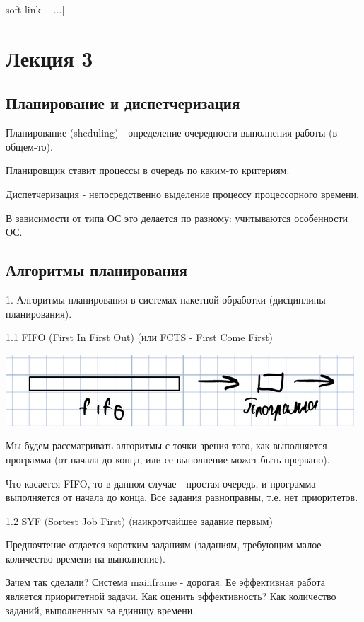 \documentclass[14pt, a4paper]{article}
\begin{document}
	soft link - [...]
	
	\pagebreak
	
	\section{Лекция 3}
	\subsection{Планирование и диспетчеризация}
	
	Планирование (sheduling) - определение очередности выполнения работы (в общем-то).
	
	Планировщик ставит процессы в очередь по каким-то критериям.
	
	Диспетчеризация - непосредственно выделение процессу процессорного времени.
	
	В зависимости от типа ОС это делается по разному: учитываются особенности ОС.
	
	\subsection{Алгоритмы планирования}
	
	1. Алгоритмы планирования в системах пакетной обработки (дисциплины планирования).
	
	1.1 FIFO (First In First Out) (или FCTS - First Come First)
	
	\includegraphics[width=\linewidth]{1}
	
	Мы будем рассматривать алгоритмы с точки зрения того, как выполняется программа (от начала до конца, или ее выполнение может быть прервано).
	
	Что касается FIFO, то в данном случае - простая очередь, и программа выполняется от начала до конца. Все задания равноправны, т.е. нет приоритетов.
	
	1.2 SYF (Sortest Job First) (наикротчайшее задание первым)
	
	Предпочтение отдается коротким заданиям (заданиям, требующим малое количество времени на выполнение).
	
	Зачем так сделали? Система mainframe - дорогая. Ее эффективная работа является приоритетной задачи. Как оценить эффективность? Как количество заданий, выполненных за единицу времени.
	
\end{document}

